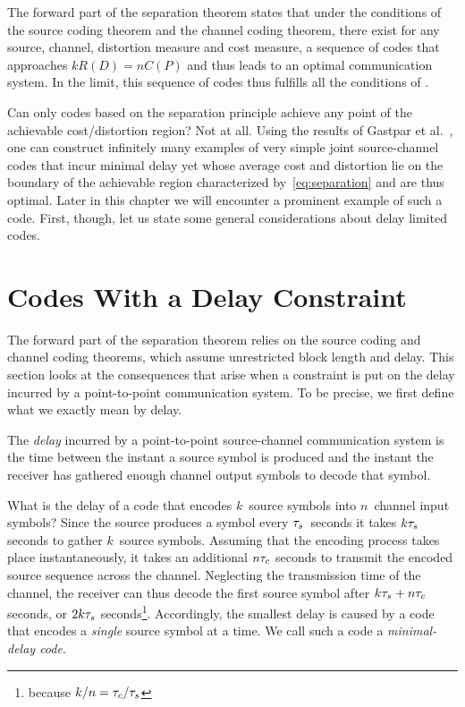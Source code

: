 The forward part of the separation theorem states that under the
conditions of the source coding theorem and the channel coding theorem, there
exist for any source, channel, distortion measure and cost measure, a sequence
of codes that approaches $k R(D) = nC(P)$ and thus leads to an optimal
communication system. In the limit, this sequence of codes thus fulfills all the
conditions of .

Can only codes based on the separation principle achieve any point of the
achievable cost\slash distortion region? Not at all. Using the results of
Gastpar et al.~\cite{GastparRV2003}, one can construct infinitely many examples
of very simple joint source-channel codes that incur minimal delay yet whose
average cost and distortion lie on the boundary of the achievable region
characterized by~\eqref{eq:separation} and are thus optimal. Later
in this chapter we will encounter a prominent example of such a code. First,
though, let us state some general considerations about delay limited codes.


\section{Codes With a Delay Constraint}\label{sec:delayconstraint}

The forward part of the separation theorem relies on the source coding and
channel coding theorems, which assume unrestricted block length and
delay. This section looks at the consequences that arise when a
constraint is put on the delay incurred by a point-to-point communication
system. To be precise, we first define what we exactly mean by delay.

\begin{definition}
  \label{def:delay}
  The \emph{delay} incurred by a point-to-point source-channel communication
  system is the time between the instant a source symbol is produced and the
  instant the receiver has gathered enough channel output symbols to decode that
  symbol. 
\end{definition}

What is the delay of a code that encodes $k$~source symbols into $n$~channel
input symbols? Since the source produces a symbol every ${\tau_s}$~seconds it takes
$k{\tau_s}$ seconds to gather $k$~source symbols. Assuming that the encoding process
takes place instantaneously, it takes an additional $n{\tau_c}$ seconds to transmit
the encoded source sequence across the channel. Neglecting the transmission time
of the channel, the receiver can thus decode the first source symbol after $k{\tau_s}
+ n {\tau_c}$ seconds, or $2k{\tau_s}$ seconds\footnote{because $k/n = {\tau_c}/{\tau_s}$}.
Accordingly, the smallest delay is caused by a code that encodes a \emph{single}
source symbol at a time. We call such a code a \emph{minimal-delay code}.

